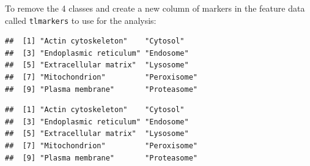 To remove the 4 classes and create a new column of markers in the
feature data called \texttt{tlmarkers} to use for the analysis:




\begin{knitrout}
\color{fgcolor}\begin{kframe}
\begin{alltt}
\hlopt{$} \hlkwb{<-} \hlopt{$}
\hlopt{$} \hlkwb{<-} \hlopt{$}

  \hlkwb{<-} \hlstd{(}\hlstd{,} \hlstd{,}
           \hlstd{,}
           \hlstd{)}
   
   \hlkwb{<-}     \hlstd{=} \hlstd{)}
   \hlkwb{<-}     \hlstd{=} \hlstd{)}
\hlstd{\}}
  \hlstd{=} \hlstd{)}
\end{alltt}
\begin{verbatim}
##  [1] "Actin cytoskeleton"    "Cytosol"              
##  [3] "Endoplasmic reticulum" "Endosome"             
##  [5] "Extracellular matrix"  "Lysosome"             
##  [7] "Mitochondrion"         "Peroxisome"           
##  [9] "Plasma membrane"       "Proteasome"
\end{verbatim}
\begin{alltt}
  \hlstd{=} \hlstd{)}
\end{alltt}
\begin{verbatim}
##  [1] "Actin cytoskeleton"    "Cytosol"              
##  [3] "Endoplasmic reticulum" "Endosome"             
##  [5] "Extracellular matrix"  "Lysosome"             
##  [7] "Mitochondrion"         "Peroxisome"           
##  [9] "Plasma membrane"       "Proteasome"
\end{verbatim}
\end{kframe}
\end{knitrout}

